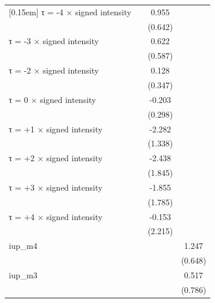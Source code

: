 \begin{table}[htbp]
\begin{tabular}{l*{3}{c}}
[0.15em]
τ = -4 × signed intensity&                     &       0.955         &                     \\
                    &                     &     (0.642)         &                     \\
[0.15em]
τ = -3 × signed intensity&                     &       0.622         &                     \\
                    &                     &     (0.587)         &                     \\
[0.15em]
τ = -2 × signed intensity&                     &       0.128         &                     \\
                    &                     &     (0.347)         &                     \\
[0.15em]
τ = 0 × signed intensity&                     &      -0.203         &                     \\
                    &                     &     (0.298)         &                     \\
[0.15em]
τ = +1 × signed intensity&                     &      -2.282\sym{*}  &                     \\
                    &                     &     (1.338)         &                     \\
[0.15em]
τ = +2 × signed intensity&                     &      -2.438         &                     \\
                    &                     &     (1.845)         &                     \\
[0.15em]
τ = +3 × signed intensity&                     &      -1.855         &                     \\
                    &                     &     (1.785)         &                     \\
[0.15em]
τ = +4 × signed intensity&                     &      -0.153         &                     \\
                    &                     &     (2.215)         &                     \\
[0.15em]
iup\_m4              &                     &                     &       1.247\sym{*}  \\
                    &                     &                     &     (0.648)         \\
[0.15em]
iup\_m3              &                     &                     &       0.517         \\
                    &                     &                     &     (0.786)         \\

\end{tabular}
\end{table}
